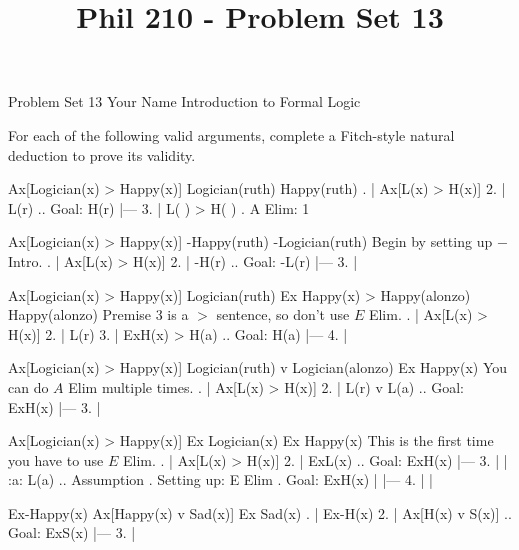 
\title{Phil 210 - Problem Set 13}

\heading
Problem Set 13
Your Name
Introduction to Formal Logic
\endheading

For each of the following valid arguments, complete a Fitch-style natural deduction to prove its validity.

\quantifiers
\problems
{}
\argument
 Ax[Logician(x) > Happy(x)]
 Logician(ruth) 
\argumentline
 Happy(ruth) 
\endargument
	\answer
	. | Ax[L(x) > H(x)]
	 2. | L(r)             ..  Goal: H(r)
	    |---
	 3. | L( ) > H( )      .  A Elim: 1
	\endfitchproof
	\endanswer

\argument
 Ax[Logician(x) > Happy(x)]
 -Happy(ruth) 
\argumentline
 -Logician(ruth) 
\endargument
\Hint Begin by setting up $-$ Intro.
	\answer
	. | Ax[L(x) > H(x)]
	 2. | -H(r)             ..  Goal: -L(r)
	    |---
	 3. | 
	\endfitchproof
	\endanswer

\argument
 Ax[Logician(x) > Happy(x)]
 Logician(ruth)
 Ex Happy(x) > Happy(alonzo)
\argumentline
 Happy(alonzo) 
\endargument
\Hint Premise 3 is a $>$ sentence, so don't use $E$ Elim.
	\answer
	. | Ax[L(x) > H(x)]
	 2. | L(r)
	 3. | ExH(x) > H(a)    ..  Goal: H(a)
	    |---
	 4. |
	\endfitchproof
	\endanswer

\argument
 Ax[Logician(x) > Happy(x)]
 Logician(ruth) v Logician(alonzo)
\argumentline
 Ex Happy(x)
\endargument
\Hint You can do $A$ Elim multiple times.
	\answer
	. | Ax[L(x) > H(x)]
	 2. | L(r) v L(a)      ..  Goal: ExH(x)
	    |---
	 3. | 
	\endfitchproof
	\endanswer

\argument
 Ax[Logician(x) > Happy(x)]
 Ex Logician(x)
\argumentline
 Ex Happy(x)
\endargument
\Hint This is the first time you have to use $E$ Elim.
	\answer
	. | Ax[L(x) > H(x)]
	 2. | ExL(x)           ..  Goal: ExH(x)
	    |---
	 3. |   | :a: L(a)     ..  Assumption  .  Setting up: E Elim  .  Goal: ExH(x)
	    |   |---
	 4. |   |
	\endfitchproof
	\endanswer

\argument
 Ex-Happy(x)
 Ax[Happy(x) v Sad(x)]
\argumentline
 Ex Sad(x)
\endargument
	\answer
	. | Ex-H(x)
	 2. | Ax[H(x) v S(x)]  ..  Goal: ExS(x)
	    |---
	 3. | 
	\endfitchproof
	\endanswer

\endproblems
\bye

